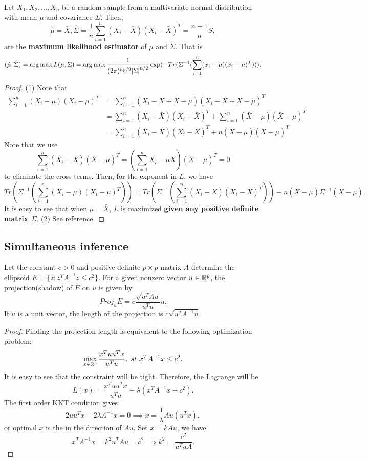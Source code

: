\begin{refsection}
\begin{lemma}\cite[172]{johnson2007applied}
Let $X_1,X_2,...,X_n$ be a random sample from a multivariate normal distribution with mean $\mu$ and covariance $\Sigma$. Then, 
$$\hat{\mu} = \bar{X}, \hat{\Sigma} = \frac{1}{n}\sum_{i=1}^n (X_i - \bar{X})(X_i - \bar{X})^T = \frac{n-1}{n}S,$$
are the \textbf{maximum likelihood estimator} of $\mu$ and $\Sigma$. That is
$$(\hat{\mu},\hat{\Sigma}) = \arg\max L(\mu,\Sigma) = \arg\max \frac{1}{(2\pi)^{np/2}\abs{\Sigma}^{n/2}}\exp(-Tr(\Sigma^{-1}(\sum_{i=1}^n (x_i - \mu)(x_i-\mu)^T))). $$ 
\end{lemma}
\begin{proof}
(1) Note that
\begin{align*}
\sum_{i=1}^n (X_i - \mu)(X_i - \mu)^T &=\sum_{i=1}^n (X_i - \bar{X} + \bar{X} - \mu)(X_i - \bar{X} + \bar{X} - \mu)^T\\
&=\sum_{i=1}^n (X_i - \bar{X})(X_i - \bar{X})^T + \sum_{i=1}^n (\bar{X} - \mu)(\bar{X} - \mu)^T \\
&=\sum_{i=1}^n (X_i - \bar{X})(X_i - \bar{X})^T + n (\bar{X} - \mu)(\bar{X} - \mu)^T 
\end{align*}
Note that we use $$\sum_{i=1}^n (X_i - \bar{X})(\bar{X} - \mu)^T =  (\sum_{i=1}^n X_i - n\bar{X})(\bar{X} - \mu)^T = 0$$
to eliminate the cross terms.
Then, for the exponent in $L$, we have
$$Tr(\Sigma^{-1}(\sum_{i=1}^n (X_i - \mu)(X_i-\mu)^T)) = Tr(\Sigma^{-1}(\sum_{i=1}^n (X_i - \bar{X})(X_i-\bar{X})^T))+ n (\bar{X} - \mu)\Sigma^{-1}(\bar{X} - \mu).$$
It is easy to see that when $\mu = \bar{X}$, $L$ is maximized \textbf{given any positive definite matrix $\Sigma$}.
(2) See reference.
\end{proof}


\subsection{Simultaneous inference }


\begin{lemma}\cite[258]{johnson2007applied}
Let the constant $c > 0$ and positive definite $p\times p$ matrix $A$ determine the ellipsoid $E=\{z: z^T A^{-1} z \leq c^2\}$. For a given nonzero vector $u\in \mathbb{R}^p$, the projection(shadow) of $E$ on $u$ is given by
$$Proj_{u} E = c\frac{\sqrt{u^TAu}}{u^Tu}u.$$
If $u$ is a unit vector, the length of the projection is $c\sqrt{u^TA^{-1}u}$  
\end{lemma}
\begin{proof}
Finding the projection length is equivalent to the following optimization problem:
$$\max_{x\in\mathbb{R}^p} \frac{x^Tuu^Tx}{u^Tu}, ~st~ x^TA^{-1}x \leq c^2.$$
It is easy to see that the constraint will be tight. Therefore, the Lagrange will be $$L(x) = \frac{x^Tuu^Tx}{u^Tu} - \lambda(x^T A^{-1}x - c^2).$$
The first order KKT condition gives
$$2uu^T x - 2\lambda A^{-1}x = 0 \implies x = \frac{1}{\lambda} Au(u^T x), $$
or optimal $x$  is the in the direction of $Au$. Set $x = kAu$, we have
$$x^TA^{-1}x = k^2 u^T A u  = c^2 \implies k^2 = \frac{c^2}{u^TuA}.$$


\end{proof}
\end{refsection}
